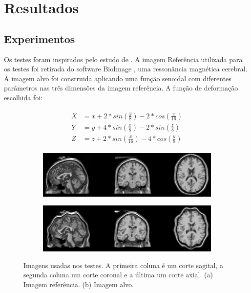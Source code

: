 \chapter{Resultados}
\label{cap:resultados}

\section{Experimentos}
  Os testes foram inspirados pelo estudo de \cite{zagorchev2006comparative}.
A imagem Referência utilizada para os testes foi retirada do software BioImage
\cite{papademetris2005bioimage}, uma ressonância magnética cerebral. A imagem
alvo foi construida aplicando uma função senoidal com diferentes parâmetros
nas três dimensões da imagem referência. A função de deformação escolhida foi:

\begin{align} \label{math:composta}
\begin{split}
  X &= x + 2*sin(\frac{y}{8}) - 2*cos(\frac{z}{16}) \\
  Y &= y + 4*sin(\frac{x}{8}) - 2*sin(\frac{z}{8}) \\
  Z &= z + 2*sin(\frac{x}{16}) - 4*cos(\frac{y}{8})
\end{split}
\end{align}

\begin{figure}[H]
    \centering
    \begin{subfigure}[t]{0.8\textwidth}
      \includegraphics[width=\textwidth]{figuras/referenceImg.png}
      \label{fig:unequalizedImage}
    \end{subfigure}
    \begin{subfigure}[t]{0.8\textwidth}
      \includegraphics[width=\textwidth]{figuras/targetImg.png}
      \label{fig:equalizedImage}
    \end{subfigure}
    \caption{Imagens usadas nos testes. A primeira coluna é um corte sagital,
             a segunda coluna um corte coronal e a última um corte axial.
             (a) Imagem referência. (b) Imagem alvo.}
    \label{fig:equalization}
\end{figure}

